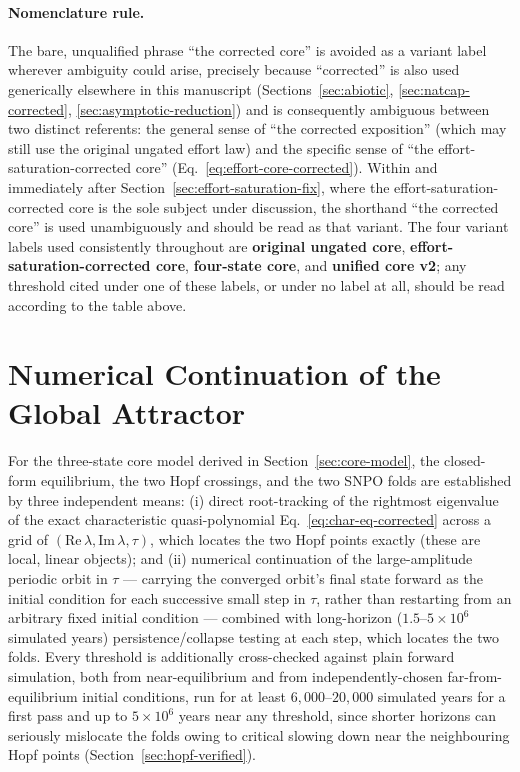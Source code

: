\documentclass[twocolumn,10pt]{article}
\begin{document}
\paragraph{Nomenclature rule.} The bare, unqualified phrase ``the corrected core'' is avoided as a variant label wherever ambiguity could arise, precisely because ``corrected'' is also used generically elsewhere in this manuscript (Sections~\ref{sec:abiotic}, \ref{sec:natcap-corrected}, \ref{sec:asymptotic-reduction}) and is consequently ambiguous between two distinct referents: the general sense of ``the corrected exposition'' (which may still use the original ungated effort law) and the specific sense of ``the effort-saturation-corrected core'' (Eq.~\eqref{eq:effort-core-corrected}). Within and immediately after Section~\ref{sec:effort-saturation-fix}, where the effort-saturation-corrected core is the sole subject under discussion, the shorthand ``the corrected core'' is used unambiguously and should be read as that variant. The four variant labels used consistently throughout are \textbf{original ungated core}, \textbf{effort-saturation-corrected core}, \textbf{four-state core}, and \textbf{unified core v2}; any threshold cited under one of these labels, or under no label at all, should be read according to the table above.


\section{Numerical Continuation of the Global Attractor}
\label{sec:numerical-continuation-corrected}
For the three-state core model derived in Section~\ref{sec:core-model}, the closed-form equilibrium, the two Hopf crossings, and the two SNPO folds are established by three independent means: (i) direct root-tracking of the rightmost eigenvalue of the exact characteristic quasi-polynomial Eq.~\eqref{eq:char-eq-corrected} across a grid of $(\text{Re}\,\lambda,\text{Im}\,\lambda,\tau)$, which locates the two Hopf points exactly (these are local, linear objects); and (ii) numerical continuation of the large-amplitude periodic orbit in $\tau$ — carrying the converged orbit's final state forward as the initial condition for each successive small step in $\tau$, rather than restarting from an arbitrary fixed initial condition — combined with long-horizon ($1.5$--$5\times10^6$ simulated years) persistence/collapse testing at each step, which locates the two folds. Every threshold is additionally cross-checked against plain forward simulation, both from near-equilibrium and from independently-chosen far-from-equilibrium initial conditions, run for at least $6{,}000$--$20{,}000$ simulated years for a first pass and up to $5\times10^6$ years near any threshold, since shorter horizons can seriously mislocate the folds owing to critical slowing down near the neighbouring Hopf points (Section~\ref{sec:hopf-verified}).
\end{document}
